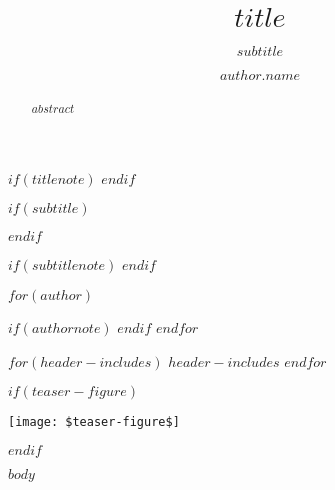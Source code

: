 \documentclass[sigchi, $if(review)$review,$endif$$if(anonymous)$anonymous,$endif$]{acmart}
\begin{document}
\title[$short-title$]{$title$}
$if(titlenote)$
$endif$

$if(subtitle)$
\subtitle{$subtitle$}
$endif$

$if(subtitlenote)$
$endif$

$for(author)$
\author{$author.name$}
$if(authornote)$
$endif$
$endfor$

\renewcommand{\shortauthors}{$short-authors$}


\begin{abstract}
$abstract$
\end{abstract}

$for(header-includes)$
$header-includes$
$endfor$


$if(teaser-figure)$
  \begin{teaserfigure}
    \texttt{[image: \$teaser-figure\$]}
    \caption{$teaser-caption$}
  \label{fig:$teaser-label$}
\end{teaserfigure}
$endif$


\maketitle

$body$



\end{document}
